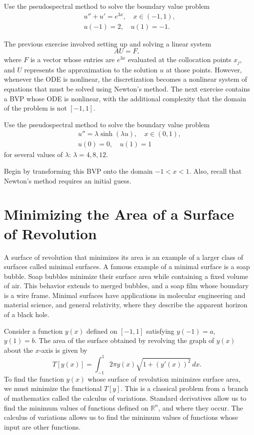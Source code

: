 \begin{problem}
	Use the pseudospectral method to solve the boundary value problem
	\begin{align*}
	&{ } u'' + u' = e^{3x}, \quad x \in (-1,1), \\
	&{ } u(-1) = 2, \quad u(1) = -1.
	\end{align*}
\end{problem}

The previous exercise involved setting up and solving a linear system 
\[
AU = F,
\]
where $F$ is a vector whose entries are $e^{3x}$ evaluated at the collocation points $x_j$, and $U$ represents the approximation to the solution $u$ at those points. 
However, whenever the ODE is nonlinear, the discretization becomes a nonlinear system of equations that must be solved using Newton's method. 
The next exercise contains a BVP whose ODE is nonlinear, with the additional complexity that the domain of the problem is not $[-1,1]$. 

\begin{problem}
Use the pseudospectral method to solve the boundary value problem
\begin{align*}
&{ } u'' = \lambda\sinh(\lambda u), \quad x \in (0,1), \\
&{ } u(0) = 0, \quad u(1) = 1
\end{align*}
for several values of $\lambda$: $\lambda = 4, 8, 12$. 

Begin by transforming this BVP onto the domain $-1<x<1$. 
Also, recall that Newton's method requires an initial guess. 
\end{problem}



\section*{Minimizing the Area of a Surface of Revolution}
A surface of revolution that minimizes its area is an example of a larger class of surfaces called minimal surfaces. A famous example of a minimal surface is a soap bubble. Soap bubbles minimize their surface area while containing a fixed volume of air. This behavior extends to merged bubbles, and a soap film whose boundary is a wire frame. Minimal surfaces have applications in molecular engineering and material science, and general relativity, where they describe the apparent horizon of a black hole.

Consider a function $y(x)$ defined on $[-1,1]$ satisfying $y(-1) = a $, $y(1) = b. $ The area of the surface obtained by revolving the graph of $y(x)$ about the $x$-axis is given by
\[T[y(x)] = \int_{-1}^1 2 \pi y(x) \sqrt{1 + (y'(x))^2}\, dx .\]
To find the function $y(x)$ whose surface of revolution minimizes surface area, we must minimize the functional $T[y]$.
This is a classical problem from a branch of mathematics called the calculus of variations.
Standard derivatives allow us to find the minimum values of functions defined on $\mathbb{R}^n$, and where they occur.
The calculus of variations allows us to find the minimum values of functions whose input are other functions.

